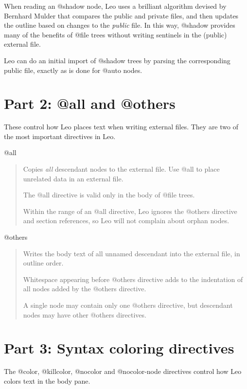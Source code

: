\documentclass[a4paper,10pt,english]{sphinxmanual}
\begin{document}
When reading an @shadow node, Leo uses a brilliant algorithm devised by
Bernhard Mulder that compares the public and private files, and then updates the
outline based on changes to the \emph{public} file. In this way, @shadow provides
many of the benefits of @file trees without writing sentinels in the (public)
external file.

Leo can do an initial import of @shadow trees by parsing the corresponding
public file, exactly as is done for @auto nodes.


\section{Part 2: @all and @others}
\label{directives:part-2-all-and-others}
These control how Leo places text when writing external files.
They are two of the most important directives in Leo.
\begin{description}
\end{description}

@all
\begin{quote}

Copies \emph{all} descendant nodes to the external file. Use @all to place
unrelated data in an external file.

The @all directive is valid only in the body of @file trees.

Within the range of an @all directive, Leo ignores the @others directive
and section references, so Leo will not complain about orphan nodes.
\end{quote}

@others
\begin{quote}

Writes the body text of all unnamed descendant into the external file, in
outline order.

Whitespace appearing before @others directive adds to the indentation of
all nodes added by the @others directive.

A single node may contain only one @others directive, but descendant nodes
may have other @others directives.
\end{quote}


\section{Part 3: Syntax coloring directives}
\label{directives:part-3-syntax-coloring-directives}
The @color, @killcolor, @nocolor and @nocolor-node directives control how
Leo colors text in the body pane.
\end{document}
